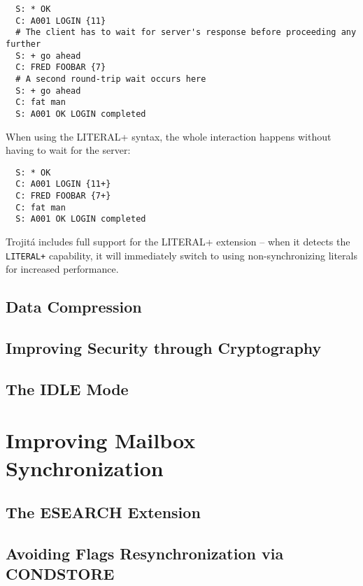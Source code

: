 \documentclass[trojita]{subfiles}
\begin{document}
\begin{verbatim}
  S: * OK
  C: A001 LOGIN {11}
  # The client has to wait for server's response before proceeding any further
  S: + go ahead
  C: FRED FOOBAR {7}
  # A second round-trip wait occurs here
  S: + go ahead
  C: fat man
  S: A001 OK LOGIN completed
\end{verbatim}

When using the LITERAL+ syntax, the whole interaction happens without having to wait for the server:

\begin{verbatim}
  S: * OK
  C: A001 LOGIN {11+}
  C: FRED FOOBAR {7+}
  C: fat man
  S: A001 OK LOGIN completed
\end{verbatim}

Trojitá includes full support for the LITERAL+ extension -- when it detects the {\tt LITERAL+} capability, it will
immediately switch to using non-synchronizing literals for increased performance.

\subsection{Data Compression}

\cite{rfc4978}

\subsection{Improving Security through Cryptography}

\cite{rfc2595}

\subsection{The IDLE Mode}
\label{sec:imap-idle}

\cite{rfc2177}

\section{Improving Mailbox Synchronization}

\subsection{The ESEARCH Extension}

\cite{rfc4731}

\subsection{Avoiding Flags Resynchronization via CONDSTORE}
\end{document}
